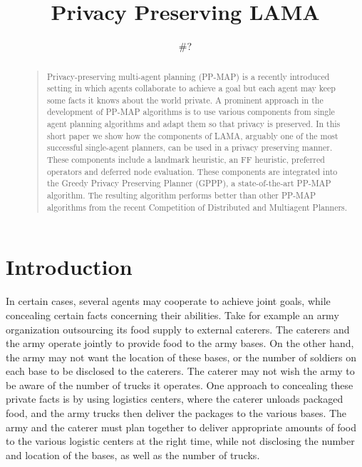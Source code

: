 \documentclass[letterpaper]{article}
\theoremstyle{definition}
\begin{document}
%
\title{Privacy Preserving LAMA}
\author{\#?}
\maketitle
\begin{abstract}
\begin{quote}
Privacy-preserving multi-agent planning (PP-MAP) is a recently introduced setting 
in which agents collaborate to achieve a goal but each agent may keep some facts it knows about the world private. A prominent approach in the development of PP-MAP algorithms is to use various components from single agent planning algorithms and adapt them so that privacy is preserved. In this short paper we show how the components of LAMA, arguably one of the most successful single-agent planners, can be used in a privacy preserving manner. These components include a landmark heuristic, an FF heuristic, preferred operators and deferred node evaluation. These components are integrated into the Greedy Privacy Preserving Planner (GPPP), a state-of-the-art PP-MAP algorithm. The resulting algorithm performs better than other PP-MAP algorithms from the recent Competition of Distributed and Multiagent Planners. 
\end{quote}
\end{abstract}


\section{Introduction}

In certain cases, several agents may cooperate to achieve joint goals, while concealing certain facts concerning their abilities. Take for example an army organization outsourcing its food supply to external caterers. The caterers and the army operate jointly to provide food to the army bases. On the other hand, the army may not want the location of these bases, or the number of soldiers on each base to be disclosed to the caterers. The caterer may not wish the army to be aware of the number of trucks it operates. One approach to concealing these private facts is by using logistics centers, where the caterer unloads packaged food, and the army trucks then deliver the packages to the various bases. The army and the caterer must plan together to deliver appropriate amounts of food to the various logistic centers at the right time, while not disclosing the number and location of the bases, as well as the number of trucks.
\end{document}
